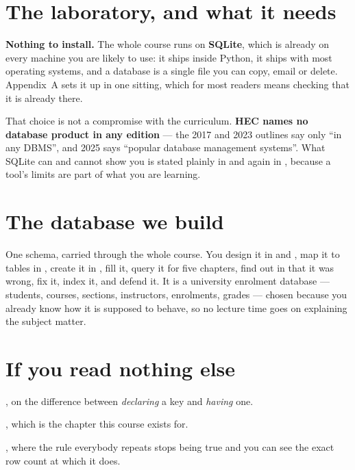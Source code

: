\section*{The laboratory, and what it needs}

\textbf{Nothing to install.} The whole course runs on \textbf{SQLite}, which
is already on every machine you are likely to use: it ships inside Python, it
ships with most operating systems, and a database is a single file you can
copy, email or delete. Appendix~A sets it up in one sitting, which for most
readers means checking that it is already there.

That choice is not a compromise with the curriculum. \textbf{HEC names no
database product in any edition} --- the 2017 and 2023 outlines say only
``in any DBMS'', and 2025 says ``popular database management systems''. What
SQLite can and cannot show you is stated plainly in  and
again in , because a tool's limits are part of what you are
learning.

\section*{The database we build}

One schema, carried through the whole course. You design it in
 and , map it to tables in ,
create it in , fill it, query it for five chapters, find out in
 that it was wrong, fix it, index it, and defend it. It is
a university enrolment database --- students, courses, sections, instructors,
enrolments, grades --- chosen because you already know how it is supposed to
behave, so no lecture time goes on explaining the subject matter.

\section*{If you read nothing else}

\begin{tight}
  \item {}, on the difference between \emph{declaring} a key
        and \emph{having} one.
  \item {}, which is the chapter this course exists for.
  \item {}, where the rule everybody repeats stops being true and
        you can see the exact row count at which it does.
\end{tight}

